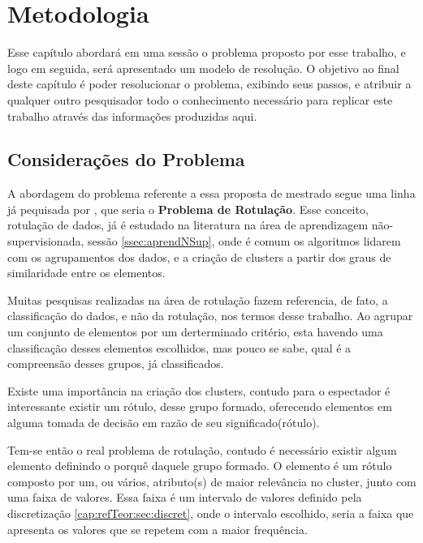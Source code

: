 \chapter{Metodologia} \label{cap:ferramentas}

Esse capítulo abordará em uma sessão o problema proposto por esse trabalho, e logo em seguida, será apresentado um modelo de resolução. O objetivo ao final deste capítulo é poder resolucionar o problema, exibindo seus passos, e atribuir a qualquer outro pesquisador todo o conhecimento necessário para replicar este trabalho através das informações produzidas aqui.

\section{Considerações do Problema}\label{cap:ferramentas:sec:considproblema}

A abordagem do problema referente a essa proposta de mestrado segue uma linha já pequisada por \cite{Lopes}, que seria o \textbf{Problema de Rotulação}. Esse conceito, rotulação de dados,  já é estudado na literatura na área de aprendizagem não-supervisionada, sessão \ref{ssec:aprendNSup}, onde é comum os algoritmos lidarem com os agrupamentos dos dados, e a criação de clusters a partir dos graus de  similaridade entre os elementos.

Muitas pesquisas realizadas na área de rotulação fazem referencia, de fato, a classificação do dados, e não da rotulação, nos termos desse trabalho. Ao agrupar um conjunto de elementos por um derterminado critério, esta havendo uma classificação desses elementos escolhidos, mas pouco se sabe, qual é a compreensão desses grupos, já classificados. 

Existe uma importância na criação dos clusters, contudo para o espectador é interessante existir um rótulo, desse grupo formado, oferecendo elementos em alguma tomada de decisão em razão de seu significado(rótulo).

Tem-se então o real problema de rotulação, contudo é necessário existir algum elemento definindo o porquê daquele grupo formado. O elemento é um rótulo composto por um, ou vários, atributo(s) de maior relevância no cluster, junto com uma faixa de valores. Essa faixa é um intervalo de valores definido pela discretização \ref{cap:refTeor:sec:discret}, onde o intervalo escolhido, seria a faixa que apresenta os valores que se repetem com a maior frequência.

